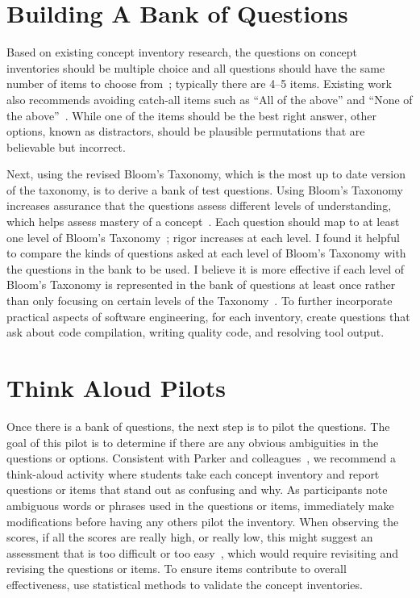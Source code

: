 \section{Building A Bank of Questions}

Based on existing concept inventory research, the questions on concept inventories should be multiple choice and all questions should have the same number of items to choose from~\cite{tew2010developing}; typically there are 4--5 items. Existing work also recommends avoiding catch-all items such as ``All of the above'' and ``None of the above''~\cite{tew2010developing}. While one of the items should be the best right answer, other options, known as distractors, should be plausible permutations that are believable but incorrect. 

Next, using the revised Bloom's Taxonomy, which is the most up to date version of the taxonomy, is to derive a bank of test questions. Using Bloom's Taxonomy increases assurance that the questions assess different levels of understanding, which helps assess mastery of a concept~\cite{scott2003bloom, thompson2008bloom}. Each question should map to at least one level of Bloom's Taxonomy~\cite{starr2008bloom,khairuddin2008application}; rigor increases at each level. I found it helpful to compare the kinds of questions asked at each level of Bloom's Taxonomy with the questions in the bank to be used. I believe it is more effective if each level of Bloom's Taxonomy is represented in the bank of questions at least once rather than only focusing on certain levels of the Taxonomy~\cite{scott2003bloom}. 
To further incorporate practical aspects of software engineering, for each inventory, create questions that ask about code compilation, writing quality code, and resolving tool output. 

\section{Think Aloud Pilots}
Once there is a bank of questions, the next step is to pilot the questions. The goal of this pilot is to determine if there are any obvious ambiguities in the questions or options. Consistent with Parker and colleagues~\cite{parker2016replication}, we recommend a think-aloud activity where students take each concept inventory and report questions or items that stand out as confusing and why. As participants note ambiguous words or phrases used in the questions or items, immediately make modifications before having any others pilot the inventory. When observing the scores, if all the scores are really high, or really low, this might suggest an assessment that is too difficult or too easy~\cite{nelson1967testing}, which would require revisiting and revising the questions or items. To ensure items contribute to overall effectiveness, use statistical methods to validate the concept inventories.

